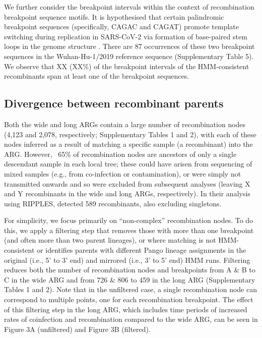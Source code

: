 \documentclass{article}
\begin{document}
We further consider the breakpoint intervals within the context of
recombination breakpoint sequence motifs. It is hypothesised that certain
palindromic breakpoint sequences (specifically, CAGAC and CAGAT) promote
template switching during replication in SARS-CoV-2 via formation of
base-paired stem loops in the genome structure \citep{Gallaher2020-lb}. There
are 87 occurrences of these two breakpoint sequences in the Wuhan-Hu-1/2019
reference sequence (Supplementary Table 5). We observe that XX (XX\%) of the
breakpoint intervals of the HMM-consistent recombinants span at least one of
the breakpoint sequences.

\subsection{Divergence between recombinant parents}

Both the wide and long ARGs contain a large number of recombination nodes
(4,123 and 2,078, respectively; Supplementary Tables 1 and 2), with each of
these nodes inferred as a result of matching a specific sample (a recombinant)
into the ARG. However, ~65\% of recombination nodes are ancestors of only a
single descendant sample in each local tree; these could have arisen from
sequencing of mixed samples (e.g., from co-infection or contamination), or were
simply not transmitted onwards and so were excluded from subsequent analyses
(leaving X and Y recombinants in the wide and long ARGs, respectively). In
their analysis using RIPPLES, \cite{Turakhia2022-it} detected 589 recombinants,
also excluding singletons.

For simplicity, we focus primarily on ``non-complex'' recombination nodes. To do
this, we apply a filtering step that removes those with more than one
breakpoint (and often more than two parent lineages), or where matching is not
HMM-consistent or identifies parents with different Pango lineage assignments
in the original (i.e., 5’ to 3’ end) and mirrored (i.e., 3’ to 5’ end) HMM
runs. Filtering reduces both the number of recombination nodes and breakpoints
from  A \& B to C in the wide ARG and from 726 \& 806 to 459 in the long ARG
(Supplementary Tables 1 and 2). Note that in the unfiltered case, a single
recombination node can correspond to multiple points, one for each
recombination breakpoint. The effect of this filtering step in the long ARG,
which includes time periods of increased rates of coinfection and recombination
compared to the wide ARG, can be seen in Figure 3A (unfiltered) and Figure 3B
(filtered).
\end{document}
